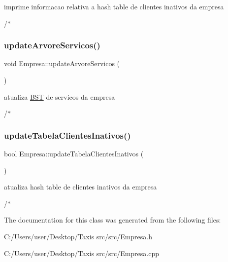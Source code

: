 imprime informacao relativa a hash table de clientes inativos da empresa 

/$\ast$ \mbox{\label{class_empresa_a218427b819a92be11e5f1c808dcd3153}} 
\subsubsection{\texorpdfstring{update\+Arvore\+Servicos()}{updateArvoreServicos()}}
{\footnotesize\ttfamily void Empresa\+::update\+Arvore\+Servicos (\begin{DoxyParamCaption}{ }\end{DoxyParamCaption})}



atualiza \hyperlink{class_b_s_t}{B\+ST} de servicos da empresa 

/$\ast$ \mbox{\label{class_empresa_a99f0d3892ad29e4c44e72f14189c4388}} 
\subsubsection{\texorpdfstring{update\+Tabela\+Clientes\+Inativos()}{updateTabelaClientesInativos()}}
{\footnotesize\ttfamily bool Empresa\+::update\+Tabela\+Clientes\+Inativos (\begin{DoxyParamCaption}{ }\end{DoxyParamCaption})}



atualiza hash table de clientes inativos da empresa 

/$\ast$ 

The documentation for this class was generated from the following files\+:\begin{DoxyCompactItemize}
\item 
C\+:/\+Users/user/\+Desktop/\+Taxis src/src/Empresa.\+h\item 
C\+:/\+Users/user/\+Desktop/\+Taxis src/src/Empresa.\+cpp\end{DoxyCompactItemize}
